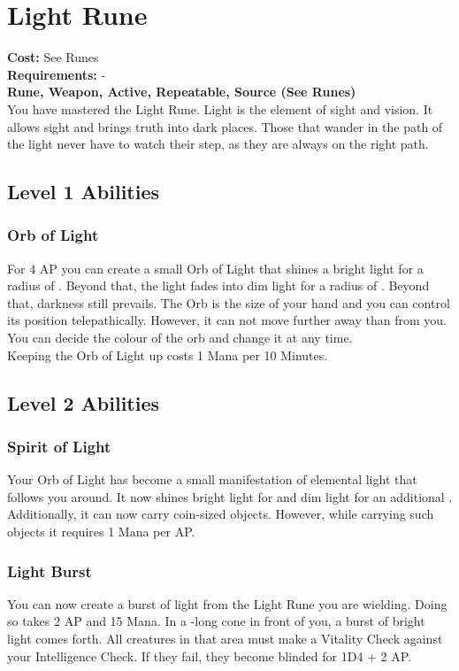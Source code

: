 \twocolumn
\section{Light Rune}\label{rune:light}
\textbf{Cost:} See Runes\\
\textbf{Requirements:} -\\
\textbf{Rune, Weapon, Active, Repeatable, Source (See Runes)}\\
You have mastered the Light Rune.
Light is the element of sight and vision.
It allows sight and brings truth into dark places. Those that wander in the path of the light never have to watch their step, as they are always on the right path.
\subsection{Level 1 Abilities}

\subsubsection{Orb of Light}
For 4 AP you can create a small Orb of Light that shines a bright light for a radius of .
Beyond that, the light fades into dim light for a radius of .
Beyond that, darkness still prevails.
The Orb is the size of your hand and you can control its position telepathically.
However, it can not move further away than  from you.
You can decide the colour of the orb and change it at any time. \\
Keeping the Orb of Light up costs 1 Mana per 10 Minutes.


\subsection{Level 2 Abilities}

\subsubsection{Spirit of Light}
Your Orb of Light has become a small manifestation of elemental light that follows you around.
It now shines bright light for  and dim light for an additional .\\
Additionally, it can now carry coin-sized objects.
However, while carrying such objects it requires 1 Mana per AP.

\subsubsection{Light Burst}
You can now create a burst of light from the Light Rune you are wielding.
Doing so takes 2 AP and 15 Mana.
In a -long cone in front of you, a burst of bright light comes forth.
All creatures in that area must make a Vitality Check against your Intelligence Check.
If they fail, they become blinded for 1D4 + 2 AP.

